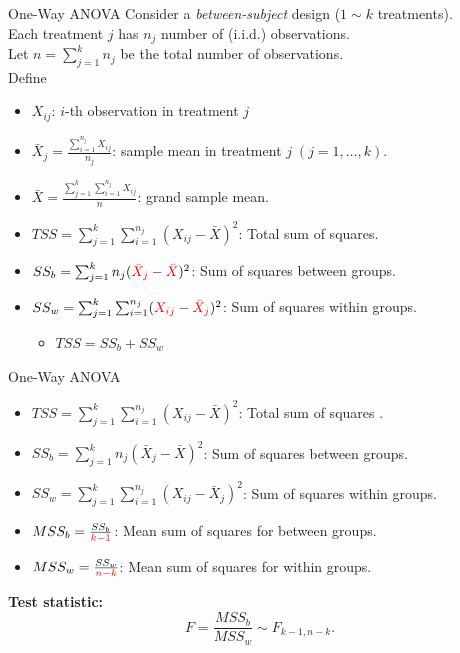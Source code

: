 \begin{frame}{One-Way ANOVA}{\cite{lee2011statistical, verma2013one}}
Consider a \textit{between-subject} design ($1\sim k$ treatments).\\
Each treatment $j$ has $n_{j}$ number of (i.i.d.) observations.\\
Let $n=\sum_{j=1}^{k} n_{j}$ be the total number of observations.\\
\vspace{3mm}
Define
    \begin{itemize}
        \item[]<2-> $X_{ij}$: $i$-th observation in treatment $j$
        \item[]<2-> $\bar{X}_{j} = \frac{\sum_{i=1}^{n_{j}}X_{ij}}{ n_{j}}$: sample mean in treatment $j \; (j=1,\dots,k)$.
        \item[]<2-> $\bar{X} = \frac{\sum_{j=1}^{k}\sum_{i=1}^{n_{j}}X_{ij}}{n}$: grand sample mean.
        \vspace{3mm}
        \item[]<3-> $TSS = \sum_{j=1}^{k} \sum_{i=1}^{n_{j}} (X_{ij}-\bar{X})^{2}$: Total sum of squares.
        \item[]<3-> $SS_{b} = \sum_{j=1}^{k} n_{j} ({\color{red}\bar{X}_{j}}-{\color{red}\bar{X}})^{2}$: Sum of squares between groups.
        \item[]<3-> $SS_{w} = \sum_{j=1}^{k}\sum_{i=1}^{n_{j}} ({\color{red}X_{ij}}-{\color{red}\bar{X}_{j}})^{2}$: Sum of squares within groups.
        \begin{itemize}
            \item<4-> $TSS = SS_{b} + SS_{w}$
        \end{itemize}
    \end{itemize}
\end{frame}

\begin{frame}{One-Way ANOVA}{\cite{lee2011statistical, verma2013one}}
    \begin{itemize}
        \item[] $TSS = \sum_{j=1}^{k} \sum_{i=1}^{n_{j}} (X_{ij}-\bar{X})^{2}$: Total sum of squares .
        \item[] $SS_{b} = \sum_{j=1}^{k} n_{j} (\bar{X}_{j}-\bar{X})^{2}$: Sum of squares between groups.
        \item[] $SS_{w} = \sum_{j=1}^{k}\sum_{i=1}^{n_{j}} (X_{ij}-\bar{X}_{j})^{2}$: Sum of squares within groups.
    \end{itemize}
    \vspace{3mm}
    \begin{itemize}
        \item $MSS_{b} = \frac{SS_{b}}{\color{red}k-1}$: Mean sum of squares for between groups.
        \item $MSS_{w} = \frac{SS_{w}}{\color{red}n-k}$: Mean sum of squares for within groups.
    \end{itemize}
    \vspace{3mm}
    \textbf{Test statistic:}
    \[
    F = \frac{MSS_{b}}{MSS_{w}} \sim F_{k-1,n-k}.
    \]
\end{frame}

